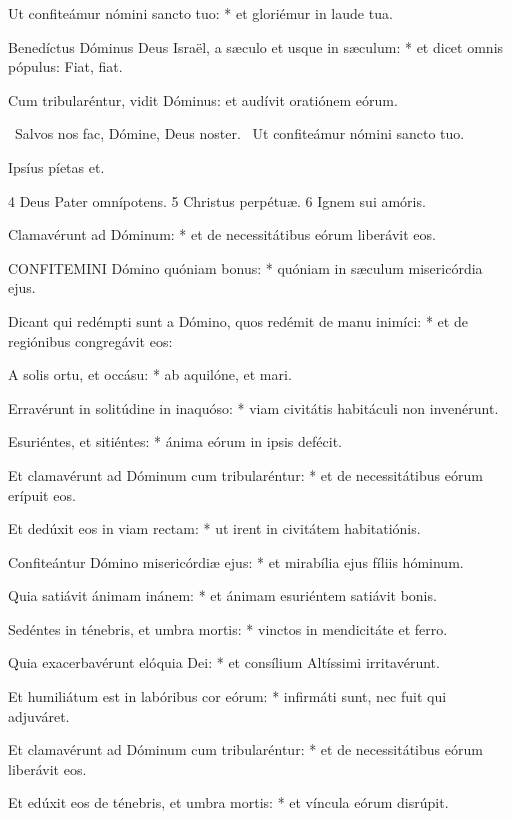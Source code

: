 Ut confiteámur nómini sancto tuo: * et gloriémur in laude tua.

Benedíctus Dóminus Deus Israël, a sæculo et usque in sæculum: * et dicet omnis pópulus: Fiat, fiat.

 Cum tribularéntur, vidit Dóminus: et audívit oratiónem eórum.


\V\ Salvos nos fac, Dómine, Deus noster. \R\ Ut confiteámur nómini sancto tuo.

 Ipsíus píetas et.

 4 Deus Pater omnípotens. 5 Christus perpétuæ. 6 Ignem sui amóris.


 Clamavérunt ad Dóminum: * et de necessitátibus eórum liberávit eos.


\lettrine[lines=2]{C}{ONFITEMINI} Dómino quóniam bonus: * quóniam in sæculum misericórdia ejus.

Dicant qui redémpti sunt a Dómino, quos redémit de manu inimíci: * et de regiónibus congregávit eos:

A solis ortu, et occásu: * ab aquilóne, et mari.

Erravérunt in solitúdine in inaquóso: * viam civitátis habitáculi non invenérunt.

Esuriéntes, et sitiéntes: * ánima eórum in ipsis defécit.

Et clamavérunt ad Dóminum cum tribularéntur: * et de necessitátibus eórum erípuit eos.

Et dedúxit eos in viam rectam: * ut irent in civitátem habitatiónis.

Confiteántur Dómino misericórdiæ ejus: * et mirabília ejus fíliis hóminum.

Quia satiávit ánimam inánem: * et ánimam esuriéntem satiávit bonis.

Sedéntes in ténebris, et umbra mortis: * vinctos in mendicitáte et ferro.

Quia exacerbavérunt elóquia Dei: * et consílium Altíssimi irritavérunt.

Et humiliátum est in labóribus cor eórum: * infirmáti sunt, nec fuit qui adjuváret.

Et clamavérunt ad Dóminum cum tribularéntur: * et de necessitátibus eórum liberávit eos.

Et edúxit eos de ténebris, et umbra mortis: * et víncula eórum disrúpit.

